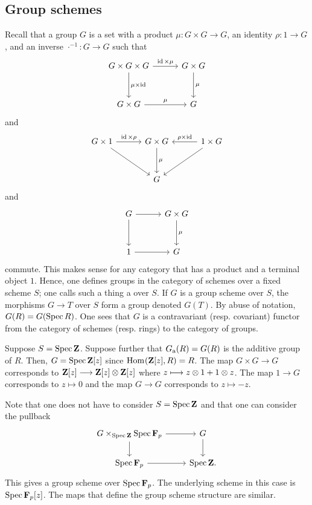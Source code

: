 \documentclass [11 pt, oneside] {article}
\begin{document}
\subsection{Group schemes}
Recall that a group $G$ is a set with a product $\mu:G\times G\longrightarrow G$, an identity $\rho:1\longrightarrow G$, and an inverse $\cdot ^{-1} : G\longrightarrow G$ such that
\[
\begin{tikzcd}[column sep = 3 em, row sep = 3 em]
	G\times G \times G \ar[r, "\id\times \mu"] \ar[d, "\mu\times \id"] & G\times G\ar[d,"\mu"]\\
	G\times G \ar[r,"\mu"] & G
\end{tikzcd}
\]
and
\[
\begin{tikzcd}[column sep = 3 em, row sep = 3 em]
	G\times 1 \ar[r, "\id\times \rho"]\ar[dr] &G\times G\ar[d, "\mu"]& 1\times G \ar[l, "\rho\times \id", swap] \ar[dl]\\
						  & G
\end{tikzcd}
\]
and
\[
\begin{tikzcd}[column sep = 3 em, row sep = 3 em]
	G\ar[r] \ar[d] & G\times G\ar[d,"\mu"]\\
	1\ar[r] & G
\end{tikzcd}
\]
commute. This makes sense for any category that has a product and a terminal object $1$. 
Hence, one defines groups in the category of schemes over a fixed scheme $S$; one calls such a thing a  over $S$. If $G$ is a group scheme over $S$, the morphisms $G\longrightarrow T$ over $S$ form a group denoted $G(T)$. By abuse of notation, $G(R) = G(\operatorname{Spec} R)$.
One sees that $G$ is a contravariant (resp. covariant) functor from the category of schemes (resp. rings) to the category of groups.

\begin{example}[ ]\label{ga}\text{}
Suppose $S=\operatorname{Spec} \mathbf{Z}$. Suppose further that $G\textsubscript{a}(R)=G(R)$ is the additive group of $R$. 
Then, $G=\operatorname{Spec} \mathbf{Z}[z]$ since $\operatorname{Hom}_{}(\mathbf{Z}[z], R)=R$. The map $G\times G\longrightarrow G$ corresponds to $\mathbf{Z}[z] \longrightarrow \mathbf{Z}[z]\otimes \mathbf{Z}[z]$ where $z\longmapsto z\otimes 1 + 1\otimes z$. The map $1\longrightarrow G$ corresponds to $z\longmapsto 0$ and the map $G\longrightarrow G$ corresponds to $z\longmapsto -z$.

Note that one does not have to consider $S=\operatorname{Spec} \mathbf{Z}$ and that one can consider the pullback
\[
\begin{tikzcd}
	G\times_{\Spec \mathbf{Z}} \Spec \mathbf{F}_{p} \ar[r]\ar[d] & G\ar[d]\\
	\Spec \mathbf{F}_{p} \ar[r] & \Spec \mathbf{Z}.
\end{tikzcd}
\]
This gives a group scheme over $\operatorname{Spec} \mathbf{F}_{p}$. The underlying scheme in this case is $\operatorname{Spec} \mathbf{F}_{p}[z]$. The maps that define the group scheme structure are similar.
\end{example}
\end{document}

